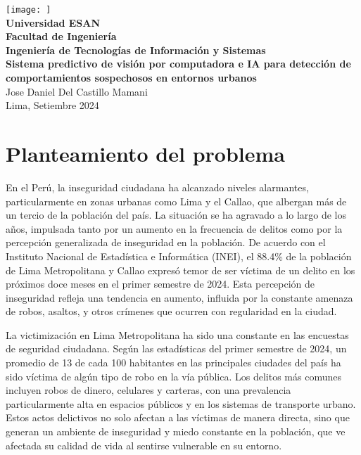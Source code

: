 \documentclass[listof=nochaptergap,12pt,times,authoryear]{report}
\begin{document}
\begin{titlepage}
    \centering
    \texttt{[image: ]} \\
    \vspace*{2cm}
    \textbf{Universidad ESAN} \\
    \textbf{Facultad de Ingeniería} \\
    \textbf{Ingeniería de Tecnologías de Información y Sistemas} \\
    \vspace*{8cm}
    \textbf{Sistema predictivo de visión por computadora e IA para detección de comportamientos sospechosos en entornos urbanos} \\
    \vspace*{5cm}
    Jose Daniel Del Castillo Mamani \\
    Lima, Setiembre 2024
\end{titlepage}

\tableofcontents
\clearpage


\chapter{Planteamiento del problema}


En el Perú, la inseguridad ciudadana ha alcanzado niveles alarmantes, particularmente en zonas urbanas como Lima y el Callao, que albergan más de un tercio de la población del país. La situación se ha agravado a lo largo de los años, impulsada tanto por un aumento en la frecuencia de delitos como por la percepción generalizada de inseguridad en la población. De acuerdo con el Instituto Nacional de Estadística e Informática (INEI), el 88.4\%  de la población de Lima Metropolitana y Callao expresó temor de ser víctima de un delito en los próximos doce meses en el primer semestre de 2024. Esta percepción de inseguridad refleja una tendencia en aumento, influida por la constante amenaza de robos, asaltos, y otros crímenes que ocurren con regularidad en la ciudad.

La victimización en Lima Metropolitana ha sido una constante en las encuestas de seguridad ciudadana. Según las estadísticas del primer semestre de 2024, un promedio de 13 de cada 100 habitantes en las principales ciudades del país ha sido víctima de algún tipo de robo en la vía pública. Los delitos más comunes incluyen robos de dinero, celulares y carteras, con una prevalencia particularmente alta en espacios públicos y en los sistemas de transporte urbano. Estos actos delictivos no solo afectan a las víctimas de manera directa, sino que generan un ambiente de inseguridad y miedo constante en la población, que ve afectada su calidad de vida al sentirse vulnerable en su entorno.
\end{document}
